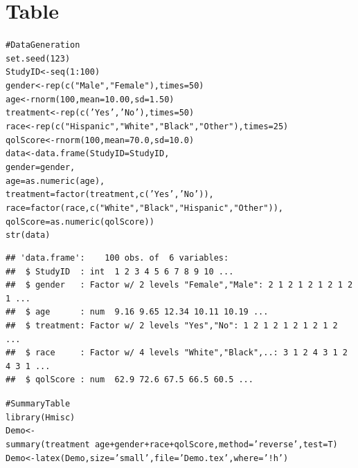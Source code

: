 \documentclass[11pt, a4paper]{article}\usepackage[]{graphicx}\usepackage[]{color}
\makeatletter
\newcommand{\hlnum}[1]{\textcolor[rgb]{0.502,0.086,1}{#1}}%
\newcommand{\hlstr}[1]{\textcolor[rgb]{1,0.4,0.2}{#1}}%
\newcommand{\hlcom}[1]{\textcolor[rgb]{1,0.251,0.502}{#1}}%
\newcommand{\hlopt}[1]{\textcolor[rgb]{0.251,0.251,0.251}{#1}}%
\newcommand{\hlstd}[1]{\textcolor[rgb]{0.251,0.251,0.251}{#1}}%
\newcommand{\hlkwb}[1]{\textcolor[rgb]{0,0.439,0.902}{#1}}%
\newcommand{\hlkwc}[1]{\textcolor[rgb]{0.188,0.941,0.314}{#1}}%
\newcommand{\hlkwd}[1]{\textcolor[rgb]{0.69,0.188,0.941}{#1}}%
\newenvironment{kframe}{%
 \def\at@end@of@kframe{}%
 \ifinner\ifhmode%
  \def\at@end@of@kframe{\end{minipage}}%
  \begin{minipage}{\columnwidth}%
 \fi\fi%
 \def\FrameCommand##1{\hskip\@totalleftmargin \hskip-\fboxsep
 \colorbox{shadecolor}{##1}\hskip-\fboxsep
     \hskip-\linewidth \hskip-\@totalleftmargin \hskip\columnwidth}%
 \MakeFramed {\advance\hsize-\width
   \@totalleftmargin\z@ \linewidth\hsize
   \@setminipage}}%
 {\par\unskip\endMakeFramed%
 \at@end@of@kframe}
\newenvironment{knitrout}{}{} %
\makeatother
\begin{document}
\section{Table}
\begin{knitrout}
\color{fgcolor}\begin{kframe}
\begin{alltt}
\hlcom{#Data Generation}
\hlkwd{set.seed}\hlstd{(}\hlnum{123}\hlstd{)}
\hlstd{StudyID}\hlkwb{<-}\hlkwd{seq}\hlstd{(}\hlnum{1}\hlopt{:}\hlnum{100}\hlstd{)}
\hlstd{gender}\hlkwb{<-}\hlkwd{rep}\hlstd{(}\hlkwd{c}\hlstd{(}\hlstr{"Male"}\hlstd{,}\hlstr{"Female"}\hlstd{),}\hlkwc{times}\hlstd{=}\hlnum{50}\hlstd{)}
\hlstd{age}\hlkwb{<-}\hlkwd{rnorm}\hlstd{(}\hlnum{100}\hlstd{,}\hlkwc{mean}\hlstd{=}\hlnum{10.00}\hlstd{,}\hlkwc{sd}\hlstd{=}\hlnum{1.50}\hlstd{)}
\hlstd{treatment}\hlkwb{<-}\hlkwd{rep}\hlstd{(}\hlkwd{c}\hlstd{(}\hlstr{'Yes'}\hlstd{,}\hlstr{'No'}\hlstd{),}\hlkwc{times}\hlstd{=}\hlnum{50}\hlstd{)}
\hlstd{race}\hlkwb{<-}\hlkwd{rep}\hlstd{(}\hlkwd{c}\hlstd{(}\hlstr{"Hispanic"}\hlstd{,}\hlstr{"White"}\hlstd{,}\hlstr{"Black"}\hlstd{,}\hlstr{"Other"}\hlstd{),}\hlkwc{times}\hlstd{=}\hlnum{25}\hlstd{)}
\hlstd{qolScore} \hlkwb{<-}\hlkwd{rnorm}\hlstd{(}\hlnum{100}\hlstd{,}\hlkwc{mean}\hlstd{=}\hlnum{70.0}\hlstd{,}\hlkwc{sd}\hlstd{=}\hlnum{10.0}\hlstd{)}
\hlstd{data}\hlkwb{<-}\hlkwd{data.frame}\hlstd{(}\hlkwc{StudyID}\hlstd{=StudyID,}
                 \hlkwc{gender}\hlstd{=gender,}
                 \hlkwc{age}\hlstd{=}\hlkwd{as.numeric}\hlstd{(age),}
                 \hlkwc{treatment}\hlstd{=}\hlkwd{factor}\hlstd{(treatment,} \hlkwd{c}\hlstd{(}\hlstr{'Yes'}\hlstd{,}\hlstr{'No'}\hlstd{)),}
                 \hlkwc{race}\hlstd{=}\hlkwd{factor}\hlstd{(race,} \hlkwd{c}\hlstd{(}\hlstr{"White"}\hlstd{,}\hlstr{"Black"}\hlstd{,} \hlstr{"Hispanic"}\hlstd{,}\hlstr{"Other"}\hlstd{)),}
                 \hlkwc{qolScore}\hlstd{=}\hlkwd{as.numeric}\hlstd{(qolScore))}
\hlkwd{str}\hlstd{(data)}
\end{alltt}
\begin{verbatim}
## 'data.frame':	100 obs. of  6 variables:
##  $ StudyID  : int  1 2 3 4 5 6 7 8 9 10 ...
##  $ gender   : Factor w/ 2 levels "Female","Male": 2 1 2 1 2 1 2 1 2 1 ...
##  $ age      : num  9.16 9.65 12.34 10.11 10.19 ...
##  $ treatment: Factor w/ 2 levels "Yes","No": 1 2 1 2 1 2 1 2 1 2 ...
##  $ race     : Factor w/ 4 levels "White","Black",..: 3 1 2 4 3 1 2 4 3 1 ...
##  $ qolScore : num  62.9 72.6 67.5 66.5 60.5 ...
\end{verbatim}
\begin{alltt}
\hlcom{#Summary Table}
\hlkwd{library}\hlstd{(Hmisc)}
\hlstd{Demo}\hlkwb{<-}\hlkwd{summary}\hlstd{(treatment}\hlopt{~}\hlstd{age}\hlopt{+}\hlstd{gender}\hlopt{+}\hlstd{race}\hlopt{+}\hlstd{qolScore,}\hlkwc{method}\hlstd{=}\hlstr{'reverse'}\hlstd{,} \hlkwc{test}\hlstd{=T)}
\hlstd{Demo}\hlkwb{<-}\hlkwd{latex}\hlstd{(Demo,} \hlkwc{size}\hlstd{=}\hlstr{'small'}\hlstd{,} \hlkwc{file}\hlstd{=}\hlstr{'Demo.tex'}\hlstd{,} \hlkwc{where}\hlstd{=}\hlstr{'!h'}\hlstd{)}
\end{alltt}
\end{kframe}
\end{knitrout}

\end{document}
